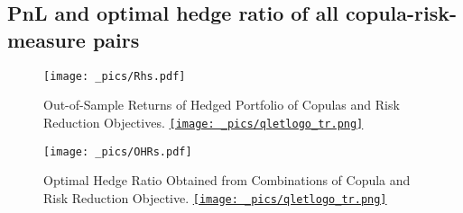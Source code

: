 \newpage
\begin{landscape}
\subsection{PnL and optimal hedge ratio of all copula-risk-measure pairs}
\begin{figure}[h]
   \centering
   \texttt{[image: \_pics/Rhs.pdf]}
   \caption{Out-of-Sample Returns of Hedged Portfolio of Copulas and Risk Reduction Objectives.
   \href{http://www.quantlet.com/}{\texttt{[image: \_pics/qletlogo\_tr.png]}}}
   \label{fig:OOSRH}
\end{figure}
\end{landscape}
\newpage

\newpage
\begin{landscape}
\begin{figure}[th]
   \centering
   \texttt{[image: \_pics/OHRs.pdf]}
   \caption{Optimal Hedge Ratio Obtained from Combinations of Copula and Risk Reduction Objective.
   \href{http://www.quantlet.com/}{\texttt{[image: \_pics/qletlogo\_tr.png]}}}
   \label{fig:OHRs}
\end{figure}
\end{landscape}
\newpage


%


